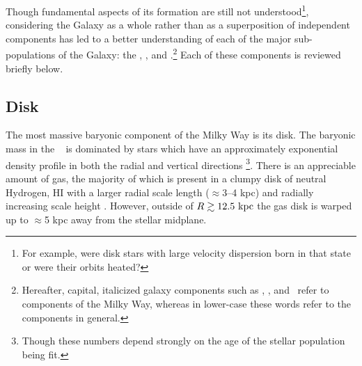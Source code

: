 Though fundamental aspects of its formation are still not understood\footnote{For example, were disk stars with large velocity dispersion born in that state or were their orbits heated?}, considering the Galaxy as a whole rather than as a superposition of independent components has led to a better understanding of each of the major sub-populations of the Galaxy: the \mwdisk, \mwbulge, and \mwhalo.\footnote{Hereafter, capital, italicized galaxy components such as \mwdisk, \mwbulge, and \mwhalo\ refer to components of the Milky Way, whereas in lower-case these words refer to the components in general.} Each of these components is reviewed briefly below.

\subsection{Disk}


The most massive baryonic component of the Milky Way is its disk. The baryonic mass in the \mwdisk\ \citep[$M_d \approx 5 \times 10^{10}~\msun$;][]{mcmillan11, todo} is dominated by stars which have an approximately exponential density profile in both the radial and vertical directions \citep[with scale lengths of $\approx$2--3 kpc and $\approx$200--400 pc, respectively; ][]{mcmillan11, bovy12-spatialMAP, todo}\footnote{Though these numbers depend strongly on the age of the stellar population being fit.}. There is an appreciable amount of  gas, the majority of which is present in a clumpy disk of neutral Hydrogen, HI \citep[$M_{\rm HI} \approx 8 \times 10^9~\msun$;][]{kalberla09} with a larger radial scale length ($\approx$3--4 kpc) and radially increasing scale height \citep[$\approx$100 pc at $R=8~\kpc$ to $\approx$1 kpc at $R=25~\kpc$;][]{wouterloot90, merrifield92}. However, outside of $R \gtrsim 12.5~\mathrm{kpc}$ the gas disk is warped up to $\approx$5 kpc away from the stellar midplane. 

